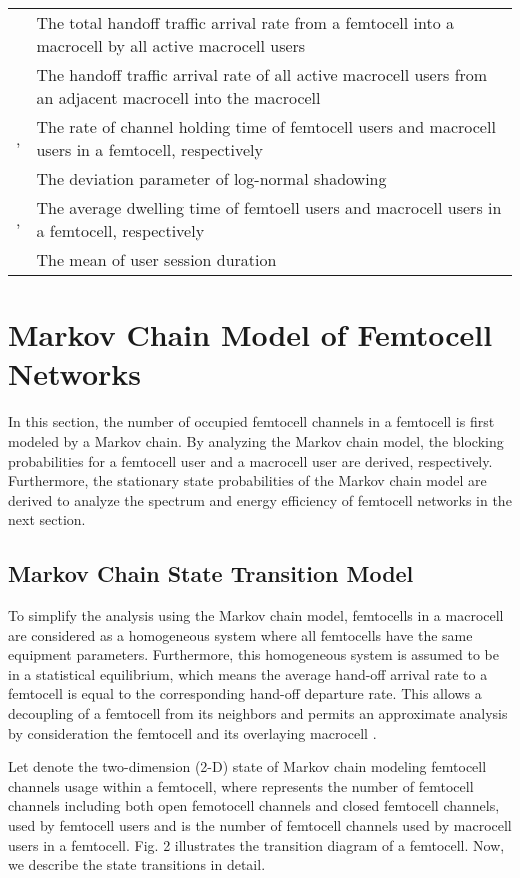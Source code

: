 \documentclass[10pt,final,journal,letterpaper,twoside,twocolumn]{IEEEtran}
\begin{document}
\begin{table*}[htbp]
\begin{tabular}{l|l}
 & The total handoff traffic arrival rate from a femtocell into a macrocell by all active macrocell users \\
 & The handoff traffic arrival rate of all active macrocell users from an adjacent macrocell into the macrocell \\
,  & The rate of channel holding time of femtocell users and macrocell users in a femtocell, respectively \\
 & The deviation parameter of log-normal shadowing \\
,  & The average dwelling time of femtoell users and macrocell users in a femtocell, respectively \\
 & The mean of user session duration \\
\hline
\end{tabular}
\end{table*}



\section{Markov Chain Model of Femtocell Networks}
\label{sec3}

In this section, the number of occupied femtocell channels in a femtocell is first modeled by a Markov chain. By analyzing the Markov chain model, the blocking probabilities for a femtocell user and a macrocell user are derived, respectively. Furthermore, the stationary state probabilities of the Markov chain model are derived to analyze the spectrum and energy efficiency of femtocell networks in the next section.

\subsection{Markov Chain State Transition Model}

To simplify the analysis using the Markov chain model, femtocells in a macrocell are considered as a homogeneous system where all femtocells have the same equipment parameters. Furthermore, this homogeneous system is assumed to be in a statistical equilibrium, which means the average hand-off arrival rate to a femtocell is equal to the corresponding hand-off departure rate. This allows a decoupling of a femtocell from its neighbors and permits an approximate analysis by consideration the femtocell and its overlaying macrocell \cite{Hu95}.

Let 
denote the two-dimension (2-D) state of Markov chain modeling femtocell channels usage within a femtocell, where  represents
the number of femtocell channels including both open femotocell channels and closed femtocell channels, used by femtocell users and  is the number of femtocell channels used by macrocell users in a femtocell. Fig. 2 illustrates the transition diagram
of a femtocell. Now, we describe the state transitions in detail.
\end{document}
